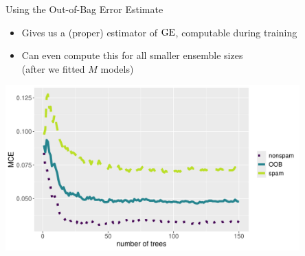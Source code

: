 \documentclass[11pt,compress,t,notes=noshow,xcolor=table]{beamer}
\begin{document}
\begin{vbframe}{Using the Out-of-Bag Error Estimate}

\begin{itemize}
  \item Gives us a (proper) estimator of $\mathrm{GE}$, computable during training
  \item Can even compute this for all smaller ensemble sizes \\
    (after we fitted $M$ models)
\end{itemize}

\vspace{1em}

\begin{knitrout}\scriptsize
{}\color{fgcolor}

{\centering \includegraphics[width=0.85\textwidth]{figure/forest-oob.pdf}

}
\end{knitrout}

\end{vbframe}
\end{document}
